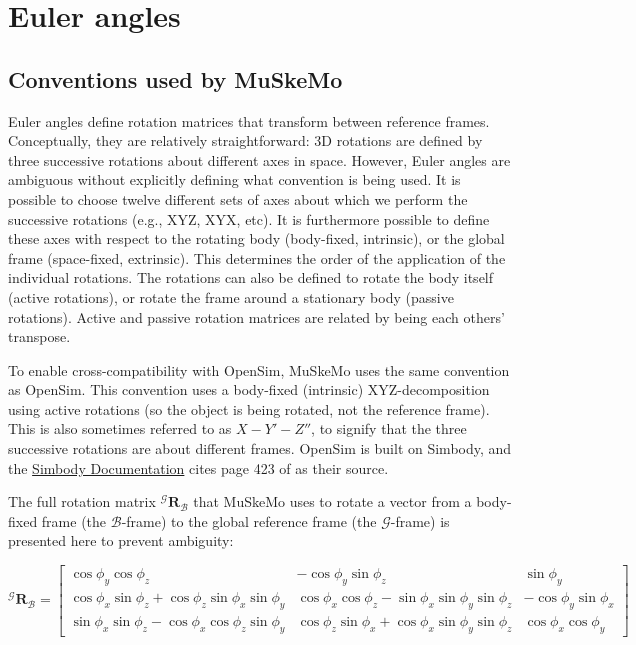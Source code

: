 \documentclass{article}
\begin{document}
\section{Euler angles}
\label{sec:eulerangles}

\subsection{Conventions used by MuSkeMo}
Euler angles define rotation matrices that transform between reference frames. Conceptually, they are relatively straightforward: 3D rotations are defined by three successive rotations about different axes in space. However, Euler angles are ambiguous without explicitly defining what convention is being used. It is possible to choose twelve different sets of axes about which we perform the successive rotations (e.g., XYZ, XYX, etc). It is furthermore possible to define these axes with respect to the rotating body (body-fixed, intrinsic), or the global frame (space-fixed, extrinsic). This determines the order of the application of the individual rotations. The rotations can also be defined to rotate the body itself (active rotations), or rotate the frame around a stationary body (passive rotations). Active and passive rotation matrices are related by being each others' transpose.

To enable cross-compatibility with OpenSim, MuSkeMo uses the same convention as OpenSim. This convention uses a body-fixed (intrinsic) XYZ-decomposition using active rotations (so the object is being rotated, not the reference frame). This is also sometimes referred to as \(X-Y'-Z''\), to signify that the three successive rotations are about different frames. OpenSim is built on Simbody, and the \href{https://simtk.org/api_docs/molmodel/api_docs22/Simbody/html/classSimTK_1_1Rotation__.html}{Simbody Documentation} cites page 423 of \cite{kaneSpacecraftDynamics1983} as their source.

The full rotation matrix ${}^{\mathcal{G}} \mathbf{R}_{\mathcal{B}}$ that MuSkeMo uses to rotate a vector from a body-fixed frame (the ${\mathcal{B}}$-frame) to the global reference frame (the ${\mathcal{G}}$-frame) is presented here to prevent ambiguity:


\begin{equation}
    {}^{\mathcal{G}} \mathbf{R}_{\mathcal{B}} =
    \begin{bmatrix}
    \cos \phi_y \cos \phi_z & -\cos \phi_y \sin \phi_z & \sin \phi_y \\
    \cos \phi_x \sin \phi_z + \cos \phi_z \sin \phi_x \sin \phi_y & \cos \phi_x \cos \phi_z - \sin \phi_x \sin \phi_y \sin \phi_z & -\cos \phi_y \sin \phi_x \\
    \sin \phi_x \sin \phi_z - \cos \phi_x \cos \phi_z \sin \phi_y & \cos \phi_z \sin \phi_x + \cos \phi_x \sin \phi_y \sin \phi_z & \cos \phi_x \cos \phi_y
    \end{bmatrix}
    \label{eq:grbmatrix}
\end{equation}
\end{document}
